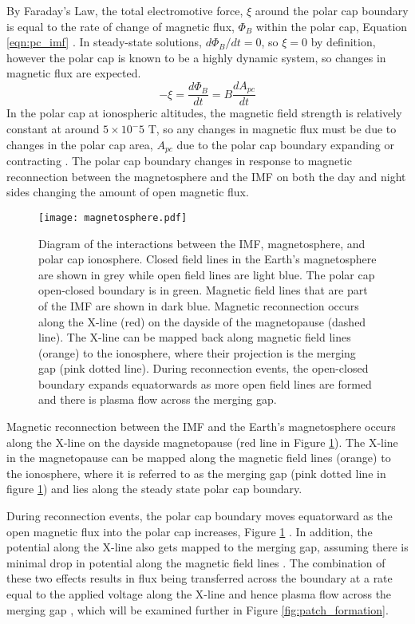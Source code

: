 By Faraday's Law, the total electromotive force, \(\xi\) around the polar cap boundary is equal to the rate of change of magnetic flux, \(\Phi_B\) within the polar cap, Equation \ref{eqn:pc_imf} \citep{Lockwood1992a}.  In steady-state solutions, \(d\Phi_B/dt = 0\), so \(\xi=0\) by definition, however the polar cap is known to be a highly dynamic system, so changes in magnetic flux are expected.
\begin{equation}
	\label{eqn:pc_imf}
	-\xi = \frac{d\Phi_B}{dt} = B\frac{dA_{pc}}{dt}
\end{equation}
In the polar cap at ionospheric altitudes, the magnetic field strength is relatively constant at around \(5\times 10^-5\) T, so any changes in magnetic flux must be due to changes in the polar cap area, \(A_{pc}\) due to the polar cap boundary expanding or contracting \citep{Lockwood1992a}.  The polar cap boundary changes in response to magnetic reconnection between the magnetosphere and the IMF  on both the day and night sides changing the amount of open magnetic flux.


\begin{figure}
	\texttt{[image: magnetosphere.pdf]}
	\caption{Diagram of the interactions between the IMF, magnetosphere, and polar cap ionosphere.  Closed field lines in the Earth's magnetosphere are shown in grey while open field lines are light blue.  The polar cap open-closed boundary is in green.  Magnetic field lines that are part of the IMF are shown in dark blue.  Magnetic reconnection occurs along the X-line (red) on the dayside of the magnetopause (dashed line).  The X-line can be mapped back along magnetic field lines (orange) to the ionosphere, where their projection is the merging gap (pink dotted line).  During reconnection events, the open-closed boundary expands equatorwards as more open field lines are formed and there is plasma flow across the merging gap.}
	\label{fig:magnetosphere}
\end{figure}

Magnetic reconnection between the IMF and the Earth's magnetosphere occurs along the X-line on the dayside magnetopause (red line in Figure \ref{fig:magnetosphere}).  The X-line in the magnetopause can be mapped along the magnetic field lines (orange) to the ionosphere, where it is referred to as the merging gap (pink dotted line in figure \ref{fig:magnetosphere}) and lies along the steady state polar cap boundary.  

During reconnection events, the polar cap boundary moves equatorward as the open magnetic flux into the polar cap increases, Figure \ref{fig:magnetosphere} \citep{Cowley1991,Lockwood1992a}.  In addition, the potential along the X-line also gets mapped to the merging gap, assuming there is minimal drop in potential along the magnetic field lines \citep{Lockwood1992b}.  The combination of these two effects results in flux being transferred across the boundary at a rate equal to the applied voltage  along the X-line and hence plasma flow across the merging gap \citep{Lockwood1992b}, which will be examined further in Figure \ref{fig:patch_formation}.  

